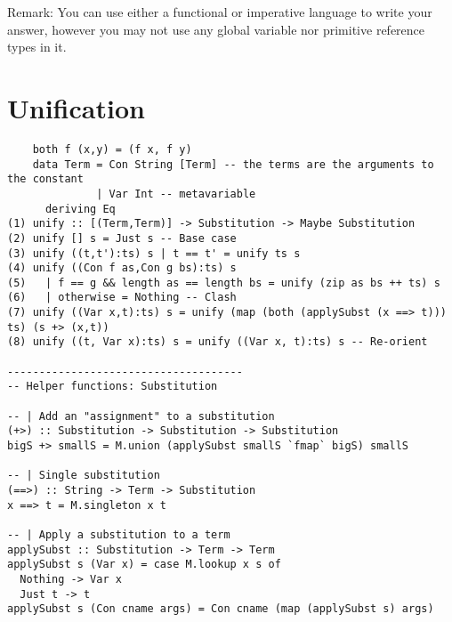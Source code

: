 \documentclass{article}
\newcommand{\answer}[1]{}
\begin{document}
Remark: You can use either a functional or imperative language to
write your answer, however you may not use any global variable nor
primitive reference types in it.

\answer{
\begin{verbatim}
data Command a = Get (Chan a) | Set a
type Variable a = Chan (Command a)

handler :: Variable a -> a -> IO ()
handler v a = do
  command <- readChan v
  case command of
    Set a' -> handler v a'
    Get c -> do
      writeChan c a
      handler v a

newVariable :: a -> IO (Variable a)
newVariable a = do
  c <- newChan
  forkIO (handler c a)
  return c

get :: Variable a -> IO a
get v = do
  c <- newChan
  writeChan v (Get c)
  readChan c

set :: Variable a -> a -> IO ()
set v a = do
  writeChan v (Set a)
\end{verbatim}
}

\section{Unification}

\begin{verbatim}
    both f (x,y) = (f x, f y)
    data Term = Con String [Term] -- the terms are the arguments to the constant
              | Var Int -- metavariable
      deriving Eq
(1) unify :: [(Term,Term)] -> Substitution -> Maybe Substitution
(2) unify [] s = Just s -- Base case
(3) unify ((t,t'):ts) s | t == t' = unify ts s
(4) unify ((Con f as,Con g bs):ts) s
(5)   | f == g && length as == length bs = unify (zip as bs ++ ts) s
(6)   | otherwise = Nothing -- Clash
(7) unify ((Var x,t):ts) s = unify (map (both (applySubst (x ==> t))) ts) (s +> (x,t))
(8) unify ((t, Var x):ts) s = unify ((Var x, t):ts) s -- Re-orient

-------------------------------------
-- Helper functions: Substitution

-- | Add an "assignment" to a substitution
(+>) :: Substitution -> Substitution -> Substitution
bigS +> smallS = M.union (applySubst smallS `fmap` bigS) smallS

-- | Single substitution
(==>) :: String -> Term -> Substitution
x ==> t = M.singleton x t

-- | Apply a substitution to a term
applySubst :: Substitution -> Term -> Term
applySubst s (Var x) = case M.lookup x s of
  Nothing -> Var x
  Just t -> t
applySubst s (Con cname args) = Con cname (map (applySubst s) args)

\end{verbatim}
\end{document}
